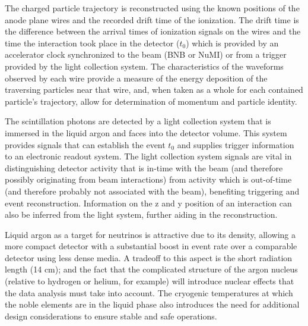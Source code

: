 The charged particle trajectory is reconstructed using the known positions of the anode plane wires and the recorded drift time of the ionization.  The drift time is the difference between the arrival times of ionization signals on the wires and the time the interaction took place in the detector ($t_0$) which is provided by an accelerator clock synchronized to the beam (BNB or NuMI) or from a trigger provided by the light collection system.  The characteristics of the waveforms observed by each wire provide a measure of the energy deposition of the traversing particles near that wire, and, when taken as a whole for each contained particle's trajectory, allow for determination of momentum and particle identity. 


The scintillation photons are detected by a light collection system that is immersed in the liquid argon and faces into the detector volume.  This system provides signals that can establish the event $t_0$ and supplies trigger information to an electronic readout system.  The light collection system signals are vital in distinguishing detector activity that is in-time with the beam (and therefore possibly originating from beam interactions) from activity which is out-of-time (and therefore probably not associated with the beam), benefiting triggering and event reconstruction.  Information on the z and y position of an interaction can also be inferred from the light system, further aiding in the reconstruction.  



Liquid argon as a target for neutrinos is attractive due to its density, allowing a more compact detector with a substantial boost in event rate over a comparable detector using less dense media.  A tradeoff to this aspect is the short radiation length (14 cm); and the fact that the complicated structure of the argon nucleus (relative to hydrogen or helium, for example) will introduce nuclear effects that the data analysis must take into account.  The cryogenic temperatures at which the noble elements are in the liquid phase also introduces the need for additional design considerations to ensure stable and safe operations.

